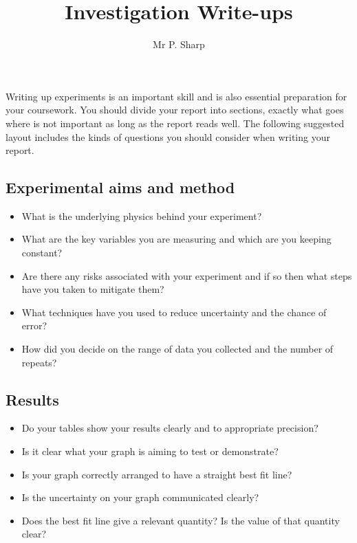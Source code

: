 \documentclass[a4paper]{article}
\title{Investigation Write-ups}
\author{Mr P. Sharp}
\date{}
\begin{document}
\maketitle \thispagestyle{fancy}
Writing up experiments is an important skill and is also essential preparation for your coursework. You should divide your report into sections, exactly what goes where is not important as long as the report reads well. The following suggested layout includes the kinds of questions you should consider when writing your report.

\subsection*{Experimental aims and method}
\begin{itemize}
    \item What is the underlying physics behind your experiment?
    \item What are the key variables you are measuring and which are you keeping constant?
    \item Are there any risks associated with your experiment and if so then what steps have you taken to mitigate them?
    \item What techniques have you used to reduce uncertainty and the chance of error?
    \item How did you decide on the range of data you collected and the number of repeats?
\end{itemize}

\subsection*{Results}
\begin{itemize}
    \item Do your tables show your results clearly and to appropriate precision?
    \item Is it clear what your graph is aiming to test or demonstrate?
    \item Is your graph correctly arranged to have a straight best fit line?
    \item Is the uncertainty on your graph communicated clearly?
    \item Does the best fit line give a relevant quantity?  Is the value of that quantity clear?
\end{itemize}
\end{document}
